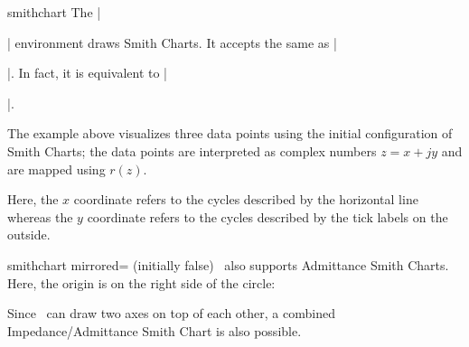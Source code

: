 \begin{environment}{{smithchart}}
	The |\begin{smithchart}| environment draws Smith Charts. It accepts the same  as |\begin{axis}|. In fact, it is equivalent to |\begin{axis}[|\meta{options}|,axis type=smithchart]|.
\begin{codeexample}[]
\end{codeexample}
	The example above visualizes three data points using the initial configuration of Smith Charts; the data points are interpreted as complex numbers $z = x + j y$ and are mapped using $r(z)$.

	Here, the $x$ coordinate refers to the cycles described by the horizontal line whereas the $y$ coordinate refers to the cycles described by the tick labels on the outside.

\begin{pgfplotskey}{smithchart mirrored= (initially false)}
	\PGFPlots\ also supports Admittance Smith Charts. Here, the origin is on the right side of the circle:
\begin{codeexample}[]
\end{codeexample}
\end{pgfplotskey}
	

	Since \PGFPlots\ can draw two axes on top of each other, a combined Impedance/Admittance Smith Chart is also possible.
\begin{codeexample}[]
\begin{tikzpicture}[]
\begin{smithchart}[
	title=Impedance and Admittance Smith Chart,
	smithchart mirrored,
	xticklabel shift=-19pt,
	grid style={blue},
	ticklabel style={blue},
	yticklabel around circle,
]
\end{smithchart}


\end{tikzpicture}
\end{codeexample}
\end{axis}
\end{axis}
\end{smithchart}
\end{environment}
